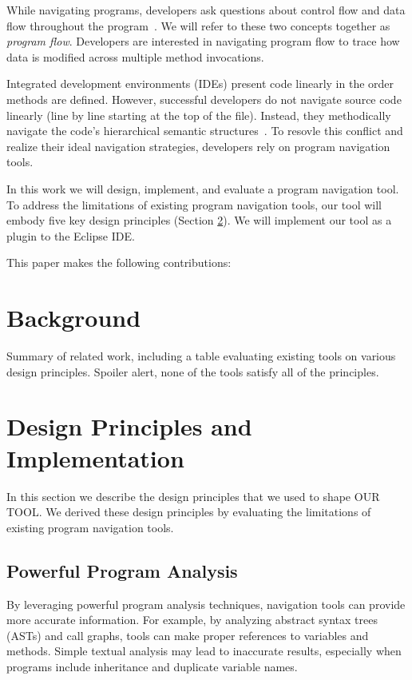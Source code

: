 \documentclass[conference]{IEEEtran}
\newcommand{\toolName}{OUR TOOL}
\begin{document}
While navigating programs, developers ask questions about control flow and data flow throughout the program~\cite{latoza2010hard, Smith2015}. We will refer to these two concepts together as \textit{program flow}. Developers are interested in navigating program flow to trace how data is modified across multiple method invocations.

Integrated development environments (IDEs) present code linearly in the order methods are defined. However, successful developers do not navigate source code linearly (line by line starting at the top of the file). Instead, they methodically navigate the code's hierarchical semantic structures~\cite{robillard2004investigate}. To resovle this conflict and realize their ideal navigation strategies, developers rely on program navigation tools. 


In this work we will design, implement, and evaluate a program navigation tool.
To address the limitations of existing program navigation tools, our tool will embody five key design principles (Section \ref{DesignPrinciples}). We will implement our tool as a plugin to the Eclipse IDE. 

This paper makes the following contributions:


\section{Background}
Summary of related work, including a table evaluating existing tools on various design principles.
Spoiler alert, none of the tools satisfy all of the principles.


\section{Design Principles and Implementation}
\label{DesignPrinciples}
In this section we describe the design principles that we used to shape \toolName. We derived these design principles by evaluating the limitations of existing program navigation tools.
 
\subsection{Powerful Program Analysis}
By leveraging powerful program analysis techniques, navigation tools can provide more accurate information.
For example, by analyzing abstract syntax trees (ASTs) and call graphs, tools can make proper references to variables and methods. 
Simple textual analysis may lead to inaccurate results, especially when programs include inheritance and duplicate variable names.
\end{document}
